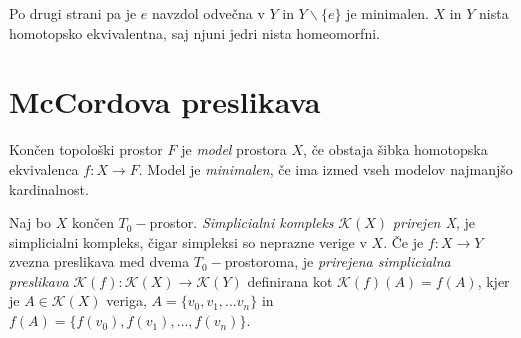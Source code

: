 \documentclass[mat1]{fmfdelo}
\begin{document}
\begin{primer}
    Po drugi strani pa je $e$ navzdol odvečna v $Y$ in $Y\backslash \{e\}$ je minimalen. $X$ in $Y$ nista homotopsko ekvivalentna, saj njuni jedri nista homeomorfni.
    

    
\end{primer}


   

\section{McCordova preslikava}\label{sec:minimal}

\begin{definicija}
    Končen topološki prostor $F$ je \emph{model} prostora $X$, če obstaja šibka homotopska ekvivalenca $f\colon X\rightarrow F$. Model je \emph{minimalen}, če ima izmed vseh modelov najmanjšo kardinalnost.
\end{definicija}


\begin{definicija}
    Naj bo $X$ končen $T_0-$prostor. \emph{Simplicialni kompleks} $\mathcal{K}(X)$ \emph{prirejen X}, je simplicialni kompleks, čigar simpleksi so neprazne verige v $X$. Če je $f\colon  X\rightarrow Y$ zvezna preslikava med dvema $T_0-$prostoroma, je \emph{prirejena simplicialna preslikava} $\mathcal{K}(f)\colon \mathcal{K}(X) \rightarrow \mathcal{K}(Y)$ definirana kot $\mathcal{K}(f)(A) = f(A)$, kjer je  $A\in \mathcal{K}(X)$ veriga, $A=\{v_0,v_1,\ldots v_n\}$ in $f(A)=\{f(v_0),f(v_1),\ldots, f(v_n)\}$.
\end{definicija}
\end{document}
